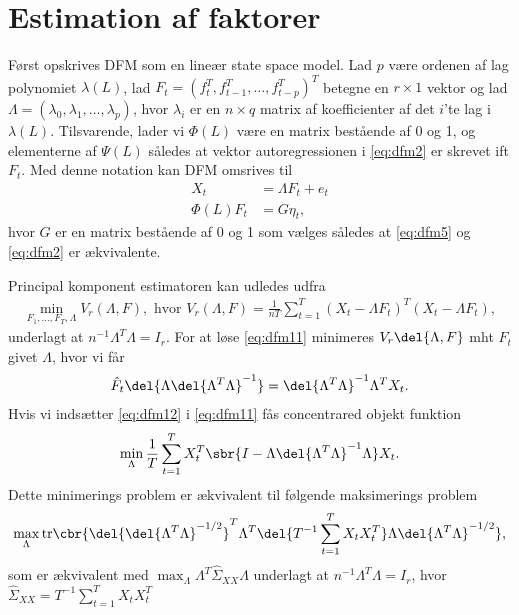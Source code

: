 \section{Estimation af faktorer}
Først opskrives DFM som en lineær state space model.
Lad $p$ være ordenen af lag polynomiet $\lambda(L)$, lad $F_t=(f_t^T,f_{t-1}^T,\ldots,f_{t-p}^T)^T$ betegne en $r \times 1$ vektor og lad $\Lambda=(\lambda_0,\lambda_1,\ldots,\lambda_p)$, hvor $\lambda_i$ er en $n \times q$ matrix af koefficienter af det $i$'te lag i $\lambda(L)$.
Tilsvarende, lader vi $\Phi(L)$ være en matrix bestående af 0 og 1, og elementerne af $\Psi(L)$ således at vektor autoregressionen i \eqref{eq:dfm2} er skrevet ift $F_t$.
Med denne notation kan DFM omsrives til
\begin{align}
X_t &= \Lambda F_t + e_t \label{eq:dfm4}\\
\Phi(L) F_t &= G \eta_t, \label{eq:dfm5}
\end{align}
hvor $G$ er en matrix bestående af 0 og 1 som vælges således at \eqref{eq:dfm5} og \eqref{eq:dfm2} er ækvivalente.

Principal komponent estimatoren kan udledes udfra 
\begin{align}
\min_{F_1,\ldots,F_T, \Lambda} V_r(\Lambda, F), \text{ hvor } V_r(\Lambda, F)=\frac{1}{nT} \sum_{t=1}^T(X_t-\Lambda F_t)^T(X_t - \Lambda F_t), \label{eq:dfm11}
\end{align}
underlagt at $n^{-1} \Lambda^T \Lambda = I_r$.
For at løse \eqref{eq:dfm11} minimeres $V_r\del{\Lambda,F}$ mht $F_t$ givet $\Lambda$, hvor vi får
\begin{align}
\hat{F}_t \del{\Lambda \del{\Lambda^T \Lambda}^{-1}}=\del{\Lambda^T \Lambda}^{-1} \Lambda^T X_t. \label{eq:dfm12}
\end{align}
Hvis vi indsætter \eqref{eq:dfm12} i \eqref{eq:dfm11} fås concentrared objekt funktion
\begin{align*}
\min_\Lambda \frac{1}{T} \sum_{t=1}^T X_t^T \sbr{I- \Lambda \del{\Lambda^T \Lambda}^{-1} \Lambda} X_t.
\end{align*}
Dette minimerings problem er ækvivalent til følgende maksimerings problem
\begin{align*}
\max_\Lambda \text{tr} \cbr{\del{\del{\Lambda^T \Lambda}^{-1/2}}^T \Lambda^T \del{T^{-1} \sum_{t=1}^T X_t X_t^T} \Lambda \del{\Lambda^T \Lambda}^{-1/2}},
\end{align*}
som er ækvivalent med $\max_\Lambda \Lambda^T \hat{\Sigma}_{XX} \Lambda$ underlagt at $n^{-1} \Lambda^T \Lambda=I_r$, hvor $\hat{\Sigma}_{XX}=T^{-1} \sum_{t=1}^T X_t X_t^T$

